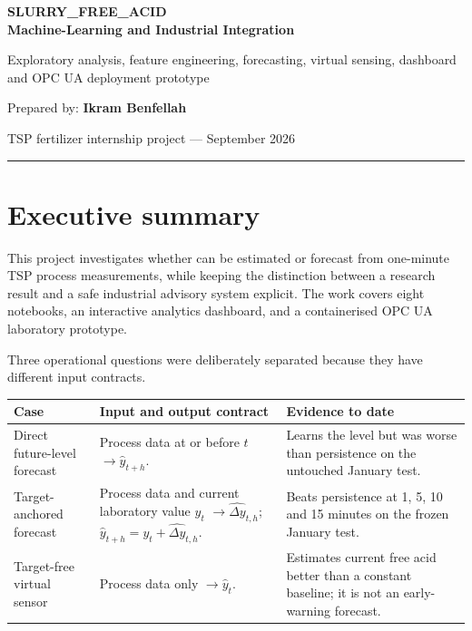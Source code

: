 \documentclass[10pt,a4paper]{article}
\begin{document}
\begin{titlepage}
\color{Navy}\vspace*{2.2cm}
{\Huge\bfseries SLURRY\_FREE\_ACID\\Machine-Learning and Industrial Integration\par}
\vspace{0.5cm}{\Large Final technical report\par}\vspace{0.8cm}
{\large Exploratory analysis, feature engineering, forecasting, virtual sensing, dashboard and OPC UA deployment prototype\par}
\vfill{\large Prepared by: \textbf{Ikram Benfellah}\par}\vspace{0.25cm}
{\large TSP fertilizer internship project --- September 2026\par}\vspace{0.5cm}\color{Gold}\rule{\textwidth}{4pt}
\end{titlepage}
\tableofcontents\newpage

\section*{Executive summary}
This project investigates whether  can be estimated or forecast from one-minute TSP process measurements, while keeping the distinction between a research result and a safe industrial advisory system explicit. The work covers eight notebooks, an interactive analytics dashboard, and a containerised OPC UA laboratory prototype.

Three operational questions were deliberately separated because they have different input contracts.
\begin{table}[H]\centering
\begin{tabularx}{\textwidth}{L{0.22\textwidth}Y Y}
\toprule \textbf{Case} & \textbf{Input and output contract} & \textbf{Evidence to date}\\ \midrule
Direct future-level forecast & Process data at or before $t$ $\rightarrow \hat y_{t+h}$. & Learns the level but was worse than persistence on the untouched January test.\\
Target-anchored forecast & Process data and current laboratory value $y_t$ $\rightarrow \widehat{\Delta y}_{t,h}$; $\hat y_{t+h}=y_t+\widehat{\Delta y}_{t,h}$. & Beats persistence at 1, 5, 10 and 15 minutes on the frozen January test.\\
Target-free virtual sensor & Process data only $\rightarrow \hat y_t$. & Estimates current free acid better than a constant baseline; it is not an early-warning forecast.\\ \bottomrule
\end{tabularx}\end{table}
\end{document}
